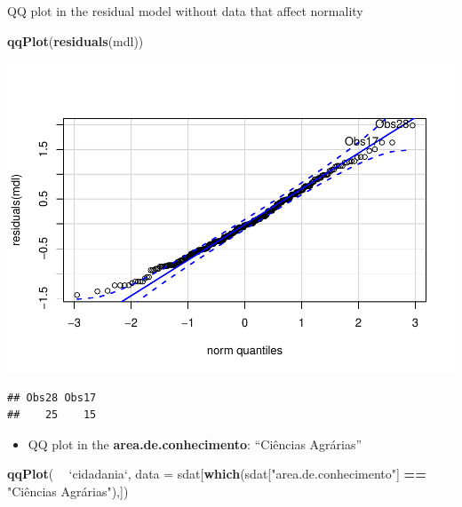 \documentclass[]{article}
\newenvironment{Shaded}{\begin{snugshade}}{\end{snugshade}}
\newcommand{\DataTypeTok}[1]{\textcolor[rgb]{0.13,0.29,0.53}{#1}}
\newcommand{\KeywordTok}[1]{\textcolor[rgb]{0.13,0.29,0.53}{\textbf{#1}}}
\newcommand{\NormalTok}[1]{#1}
\newcommand{\OperatorTok}[1]{\textcolor[rgb]{0.81,0.36,0.00}{\textbf{#1}}}
\newcommand{\StringTok}[1]{\textcolor[rgb]{0.31,0.60,0.02}{#1}}
\providecommand{\tightlist}{%
  \setlength{\itemsep}{0pt}\setlength{\parskip}{0pt}}
\begin{document}
QQ plot in the residual model without data that affect normality

\begin{Shaded}
\begin{Highlighting}[]
\KeywordTok{qqPlot}\NormalTok{(}\KeywordTok{residuals}\NormalTok{(mdl))}
\end{Highlighting}
\end{Shaded}

\includegraphics{factorialAnova_files/figure-latex/unnamed-chunk-21-1.pdf}

\begin{verbatim}
## Obs28 Obs17 
##    25    15
\end{verbatim}

\begin{itemize}
\tightlist
\item
  QQ plot in the \textbf{area.de.conhecimento}: ``Ciências Agrárias''
\end{itemize}

\begin{Shaded}
\begin{Highlighting}[]
\KeywordTok{qqPlot}\NormalTok{( }\OperatorTok{~}\StringTok{ `}\DataTypeTok{cidadania}\StringTok{`}\NormalTok{, }\DataTypeTok{data =}\NormalTok{ sdat[}\KeywordTok{which}\NormalTok{(sdat[}\StringTok{"area.de.conhecimento"}\NormalTok{] }\OperatorTok{==}\StringTok{ "Ciências Agrárias"}\NormalTok{),])}
\end{Highlighting}
\end{Shaded}
\end{document}
